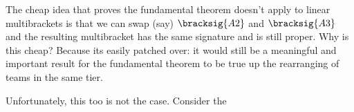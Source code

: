 {    

    The cheap idea that proves the fundamental theorem doesn't apply to linear multibrackets is that we can swap (say) $\bracksig{A2}$ and $\bracksig{A3}$ and the resulting multibracket has the same signature and is still proper. Why is this cheap? Because its easily patched over: it would still be a meaningful and important result for the fundamental theorem to be true up the rearranging of teams in the same tier.

    Unfortunately, this too is not the case. Consider the 
























}
